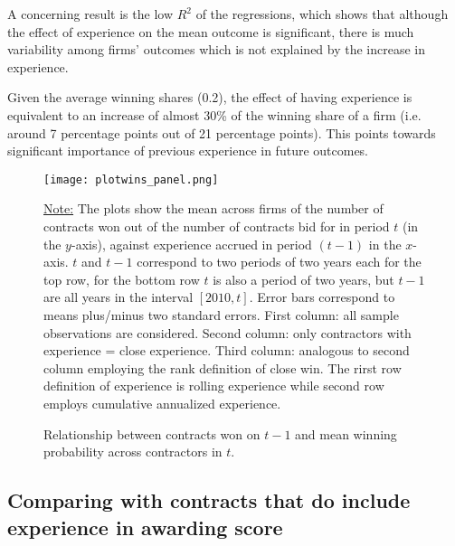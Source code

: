 A concerning result is the low $R^2$ of the regressions, which shows that although the effect of experience on the mean outcome is significant, there is much variability among firms' outcomes which is not explained by the increase in experience.

Given the average winning shares (0.2), the effect of having experience is equivalent to an increase of almost 30\% of the winning share of a firm (i.e. around 7 percentage points out of 21 percentage points). This points towards significant importance of previous experience in future outcomes.


\begin{figure}
  \texttt{[image: plotwins\_panel.png]}
  \caption{Relationship between contracts won on $t-1$ and mean winning probability across contractors in $t$.}
  \label{fig:plotresults_both}
  \vskip 0.5mm
  { \footnotesize \underline{Note:} The plots show the mean across firms of the number of contracts won out of the number of contracts bid for in period $t$ (in the $y$-axis), against experience accrued in period $(t-1)$ in the $x$-axis. $t$ and $t-1$ correspond to two periods of two years each for the top row, for the bottom row $t$ is also a period of two years, but $t-1$ are all years in the interval $[2010,t]$. Error bars correspond to means plus/minus two standard errors. First column: all sample observations are considered. Second column: only contractors with experience = close experience. Third column: analogous to second column employing the rank definition of close win.  The rirst row definition of experience is rolling experience while second row employs cumulative annualized experience.\par}
\end{figure}
\clearpage





\clearpage

\subsection{Comparing with contracts that do include experience in awarding score}

